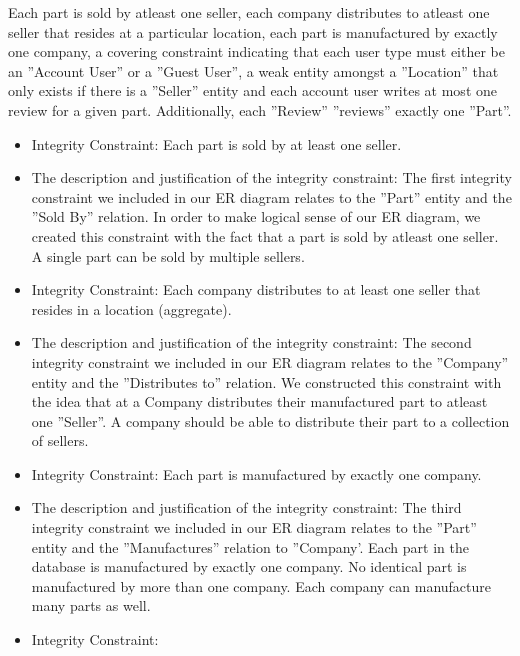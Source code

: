 {\begin{itemize}
Each part is sold by atleast one seller, each company distributes to atleast one seller that resides at a particular location, each part is manufactured by exactly one company, a covering constraint indicating that each user type must either be an ''Account User'' or a ''Guest User'', a weak entity amongst a ''Location'' that only exists if there is a ''Seller'' entity and each account user writes at most one review for a given part. Additionally, each ''Review'' ''reviews'' exactly one ''Part''. 
\begin{itemize} 
\item{ Integrity Constraint: }
Each part is sold by at least one seller.
\item{ The description and justification of the integrity constraint: }
The first integrity constraint we included in our ER diagram relates to the ''Part'' entity and the ''Sold By'' relation. In order to make logical sense of our ER diagram, we created this constraint with the fact that  a part is sold by atleast one seller. A single part can be sold by multiple sellers. 
\end{itemize}
\begin{itemize} 
\item{ Integrity Constraint: }
Each company distributes to at least one seller that resides in a location (aggregate).
\item{ The description and justification of the integrity constraint: }
The second integrity constraint we included in our ER diagram relates to the ''Company'' entity and the ''Distributes to'' relation. We constructed this constraint with the idea that at a Company distributes their manufactured part to atleast one ''Seller''. A  company should be able to distribute their part to a collection of sellers. 
\end{itemize}
\begin{itemize} 
\item{ Integrity Constraint: }
Each part is manufactured by exactly one company.
\item{ The description and justification of the integrity constraint: }
The third integrity constraint we included in our ER diagram relates to the ''Part'' entity and the ''Manufactures'' relation to ''Company'. Each part in the database is manufactured by exactly one company. No identical part is manufactured by more than one company. Each company can manufacture many parts as well.
\end{itemize}
\begin{itemize} 
\item{ Integrity Constraint: }

\end{itemize}
\end{itemize}}
